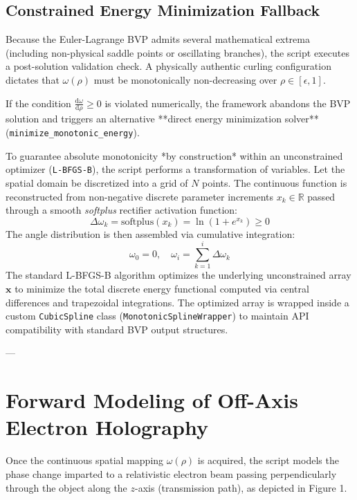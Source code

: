 \documentclass[11pt,a4paper]{article}
\newcommand{\dd}{\mathrm{d}}
\newcommand{\rhoadj}{\rho}
\newcommand{\epsilonadim}{\epsilon}
\begin{document}
\subsection{Constrained Energy Minimization Fallback}
Because the Euler-Lagrange BVP admits several mathematical extrema (including non-physical saddle points or oscillating branches), the script executes a post-solution validation check. A physically authentic curling configuration dictates that $\omega(\rhoadj)$ must be monotonically non-decreasing over $\rhoadj \in [\epsilonadim, 1]$. 

If the condition $\frac{\dd\omega}{\dd\rhoadj} \ge 0$ is violated numerically, the framework abandons the BVP solution and triggers an alternative **direct energy minimization solver** (\texttt{minimize\_monotonic\_energy}).

To guarantee absolute monotonicity *by construction* within an unconstrained optimizer (\texttt{L-BFGS-B}), the script performs a transformation of variables. Let the spatial domain be discretized into a grid of $N$ points. The continuous function is reconstructed from non-negative discrete parameter increments $x_k \in \mathbb{R}$ passed through a smooth \textit{softplus} rectifier activation function:
\begin{equation}
    \Delta \omega_k = \text{softplus}(x_k) = \ln(1 + e^{x_k}) \ge 0
\end{equation}
The angle distribution is then assembled via cumulative integration:
\begin{equation}
    \omega_0 = 0, \quad \omega_i = \sum_{k=1}^i \Delta \omega_k
\end{equation}
The standard L-BFGS-B algorithm optimizes the underlying unconstrained array $\bm{x}$ to minimize the total discrete energy functional computed via central differences and trapezoidal integrations. The optimized array is wrapped inside a custom \texttt{CubicSpline} class (\texttt{MonotonicSplineWrapper}) to maintain API compatibility with standard BVP output structures.

---

\section{Forward Modeling of Off-Axis Electron Holography}

Once the continuous spatial mapping $\omega(\rhoadj)$ is acquired, the script models the phase change imparted to a relativistic electron beam passing perpendicularly through the object along the $z$-axis (transmission path), as depicted in Figure 1.
\end{document}
